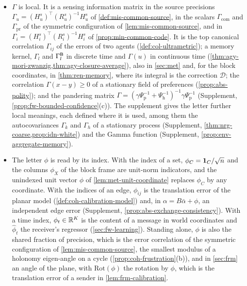 \begin{itemize}
\item $\Gamma$ is local. It is a sensing information matrix in the source precisions $\Gamma_u=(H^s_u)^\top(R^s_u)^{-1}H^s_u$ of \cref{def:mis-common-source}, in the scalars $\Gamma_{\mathrm{com}}$ and $\Gamma_{\mathrm{pr}}$ of the symmetric configuration of \cref{lem:mis-common-source}, and in $\Gamma_i=(H^s_i)^\top(R^s_i)^{-1}H^s_i$ of \cref{prop:min-common-code}. It is the top canonical correlation $\Gamma_{ij}$ of the errors of two agents (\cref{def:col-ultrametric}); a memory kernel, $\Gamma_l$ and $\Gamma^{\mathsf{B}}_l$ in discrete time and $\Gamma(u)$ in continuous time (\cref{thm:agy-mori-zwanzig,thm:agy-closure-average}), also in \cref{sec:met} and, for the block coordinates, in \cref{thm:ren-memory}, where its integral is the correction $\mathcal D$; the correlation $\Gamma(x-y)\ge0$ of a stationary field of preferences (\cref{prop:abs-polity}); and the pandering matrix $\Gamma=(\gamma\Psi_{\mathrm p}^{-1}+\Psi_{\mathrm h}^{-1})^{-1}\gamma\Psi_{\mathrm p}^{-1}$ (Supplement, \cref{prop:fw-bounded-confidence}(c)). The supplement gives the letter further local meanings, each defined where it is used, among them the autocovariances $\Gamma_k$ and $\Gamma_h$ of a stationary process (Supplement, \cref{thm:nrg-coarse,prop:idn-white}) and the Gamma function (Supplement, \cref{prop:env-aggregate-memory}).
\item The letter $\phi$ is read by its index. With the index of a set, $\phi_C=\mathbf{1}_C/\sqrt n$ and the columns $\phi_X$ of the block frame are unit-norm indicators, and the unindexed unit vector $\phi$ of \cref{lem:met-unit-coordinate} replaces $\phi_C$ by any coordinate. With the indices of an edge, $\phi_{ij}$ is the translation error of the planar model (\cref{def:coh-calibration-model}) and, in $\alpha=B\bar\alpha+\phi$, an independent edge error (Supplement, \cref{prop:abs-exchange-consistency}). With a time index, $\phi_t\in\mathbb{R}^K$ is the content of a message in world coordinates and $\hat\phi_t$ the receiver's regressor (\cref{sec:fw-learning}). Standing alone, $\phi$ is also the shared fraction of precision, which is the error correlation of the symmetric configuration of \cref{lem:mis-common-source}, the smallest modulus of a holonomy eigen-angle on a cycle (\cref{prop:coh-frustration}(b)), and in \cref{sec:frm} an angle of the plane, with $\mathrm{Rot}(\phi)$ the rotation by $\phi$, which is the translation error of a sender in \cref{lem:frm-calibration}.

\end{itemize}
